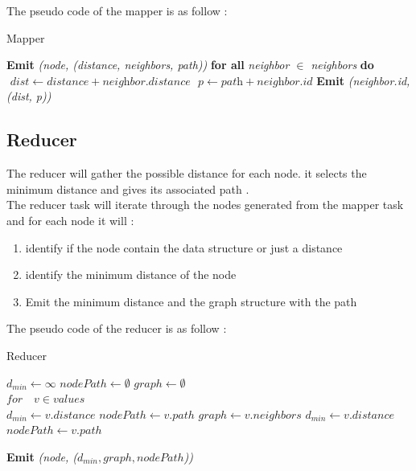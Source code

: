 \documentclass[english]{article}
\begin{document}
The pseudo code of the mapper is as follow : 
\begin{algorithm}[h]
\caption{Mapper}\label{mapper}
\begin{algorithmic}[1]
\State \textbf{Emit} \emph{(node, (distance, neighbors, path))}
\State \textbf{for all} \emph{ neighbor $ \in$ neighbors } \textbf{do}
\State $\textit{ dist} \gets \textit{distance} + \textit{neighbor.distance} $
\State $ \textit{ p} \gets \textit{path} + \textit{neighbor.id} $
\State \textbf{ Emit} \emph{(neighbor.id, (dist, p))}
\EndProcedure
\end{algorithmic}
\end{algorithm}

\newpage
\subsection{Reducer}
The reducer will gather the possible distance for each node. it selects the minimum distance and gives its associated path .\\

The reducer task will iterate through the nodes generated from the mapper task and for each node it will :
\begin{enumerate}
\item identify if the node contain the data structure or just a distance
\item identify the minimum distance of the node
\item Emit the minimum distance and the graph structure with the path
\end{enumerate}

The pseudo code of the reducer is as follow : 
\begin{algorithm}[h]
\caption{Reducer}\label{reducer}
\begin{algorithmic}[1]
\State $ d_{min} \gets \infty $
\State $ nodePath \gets \emptyset $
\State $  graph  \gets \emptyset $ \\

\State $for \quad v \in values $ \\

	\State $ d_{min} \gets  v.distance  $
	\State $ nodePath \gets v.path $
	\State $ graph \gets  v.neighbors $
\Else{}
		\State $ d_{min} \gets  v.distance $
		\State $ nodePath \gets v.path $
	\EndIf
\EndIf

\State \textbf{ Emit} \emph{(node, ($d_{min}, graph, nodePath$))}

\EndProcedure
\end{algorithmic}
\end{algorithm}
\end{document}

